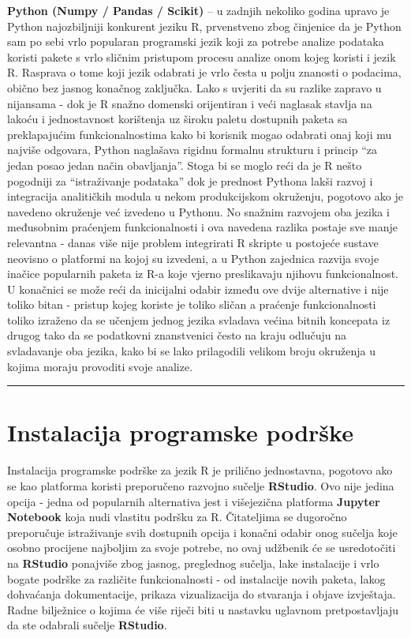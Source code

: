 \documentclass[]{book}
\theoremstyle{definition}
\theoremstyle{definition}
\theoremstyle{definition}
\theoremstyle{remark}
\begin{document}
\textbf{Python (Numpy / Pandas / Scikit)} -- u zadnjih nekoliko godina
upravo je Python najozbiljniji konkurent jeziku R, prvenstveno zbog
činjenice da je Python sam po sebi vrlo popularan programski jezik koji
za potrebe analize podataka koristi pakete s vrlo sličnim pristupom
procesu analize onom kojeg koristi i jezik R. Rasprava o tome koji jezik
odabrati je vrlo česta u polju znanosti o podacima, obično bez jasnog
konačnog zaključka. Lako s uvjeriti da su razlike zapravo u nijansama -
dok je R snažno domenski orijentiran i veći naglasak stavlja na lakoću i
jednostavnost korištenja uz široku paletu dostupnih paketa sa
preklapajućim funkcionalnostima kako bi korisnik mogao odabrati onaj
koji mu najviše odgovara, Python naglašava rigidnu formalnu strukturu i
princip ``za jedan posao jedan način obavljanja''. Stoga bi se moglo
reći da je R nešto pogodniji za ``istraživanje podataka'' dok je
prednost Pythona lakši razvoj i integracija analitičkih modula u nekom
produkcijskom okruženju, pogotovo ako je navedeno okruženje već izvedeno
u Pythonu. No snažnim razvojem oba jezika i međusobnim praćenjem
funkcionalnosti i ova navedena razlika postaje sve manje relevantna -
danas više nije problem integrirati R skripte u postojeće sustave
neovisno o platformi na kojoj su izvedeni, a u Python zajednica razvija
svoje inačice popularnih paketa iz R-a koje vjerno preslikavaju njihovu
funkcionalnost. U konačnici se može reći da inicijalni odabir između ove
dvije alternative i nije toliko bitan - pristup kojeg koriste je toliko
sličan a praćenje funkcionalnosti toliko izraženo da se učenjem jednog
jezika svladava većina bitnih koncepata iz drugog tako da se podatkovni
znanstvenici često na kraju odlučuju na svladavanje oba jezika, kako bi
se lako prilagodili velikom broju okruženja u kojima moraju provoditi
svoje analize.

\begin{center}\rule{0.5\linewidth}{\linethickness}\end{center}

\section{Instalacija programske
podrške}\label{instalacija-programske-podrske}

Instalacija programske podrške za jezik R je prilično jednostavna,
pogotovo ako se kao platforma koristi preporučeno razvojno sučelje
\textbf{RStudio}. Ovo nije jedina opcija - jedna od popularnih
alternativa jest i višejezična platforma \textbf{Jupyter Notebook} koja
nudi vlastitu podršku za R. Čitateljima se dugoročno preporučuje
istraživanje svih dostupnih opcija i konačni odabir onog sučelja koje
osobno procijene najboljim za svoje potrebe, no ovaj udžbenik će se
usredotočiti na \textbf{RStudio} ponajviše zbog jasnog, preglednog
sučelja, lake instalacije i vrlo bogate podrške za različite
funkcionalnosti - od instalacije novih paketa, lakog dohvaćanja
dokumentacije, prikaza vizualizacija do stvaranja i objave izvještaja.
Radne bilježnice o kojima će više riječi biti u nastavku uglavnom
pretpostavljaju da ste odabrali sučelje \textbf{RStudio}.
\end{document}

